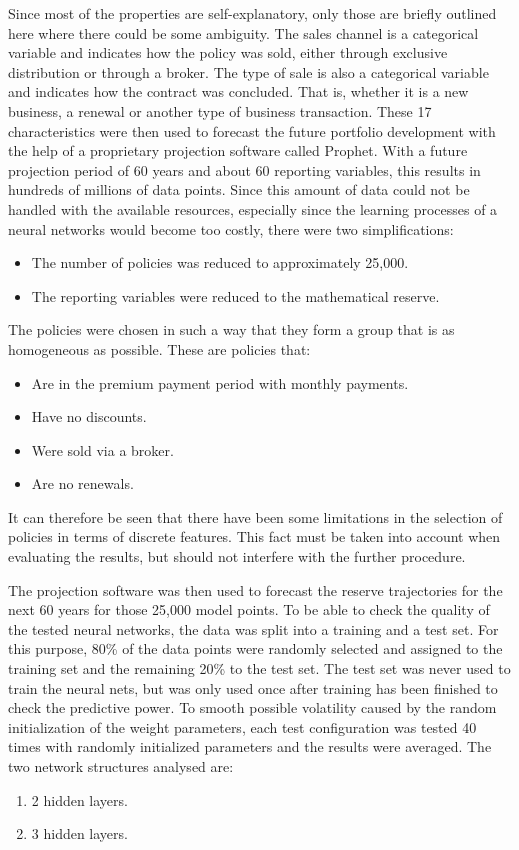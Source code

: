Since most of the properties are self-explanatory, only those are briefly outlined here where there could be some ambiguity. The sales channel is a categorical variable and indicates how the policy was sold, either through exclusive distribution or through a broker. The type of sale is also a categorical variable and indicates how the contract was concluded. That is, whether it is a new business, a renewal or another type of business transaction. These 17 characteristics were then used to forecast the future portfolio development with the help of a proprietary projection software called Prophet. With a future projection period of 60 years and about 60 reporting variables, this results in hundreds of millions of data points. Since this amount of data could not be handled with the available resources, especially since the learning processes of a neural networks would become too costly, there were two simplifications:
\begin{itemize}
	\item The number of policies was reduced to approximately 25,000. 
	\item The reporting variables were reduced to the mathematical reserve.
\end{itemize}
The policies were chosen in such a way that they form a group that is as homogeneous as possible. These are policies that:
\begin{itemize}
	\item Are in the premium payment period with monthly payments.
	\item Have no discounts.
	\item Were sold via a broker.
	\item Are no renewals. 
\end{itemize}
It can therefore be seen that there have been some limitations in the selection of policies in terms of discrete features. This fact must be taken into account when evaluating the results, but should not interfere with the further procedure.

The projection software was then used to forecast the reserve trajectories for the next 60 years for those 25,000 model points. To be able to check the quality of the tested neural networks, the data was split into a training and a test set. For this purpose, 80\% of the data points were randomly selected and assigned to the training set and the remaining 20\% to the test set. The test set was never used to train the neural nets, but was only used once after training has been finished to check the predictive power. To smooth possible volatility caused by the random initialization of the weight parameters, each test configuration was tested 40 times with randomly initialized parameters and the results were averaged. The two network structures analysed are:
\begin{enumerate}[label=\Roman*)]
	\item 2 hidden layers.
	\item 3 hidden layers.
\end{enumerate}

